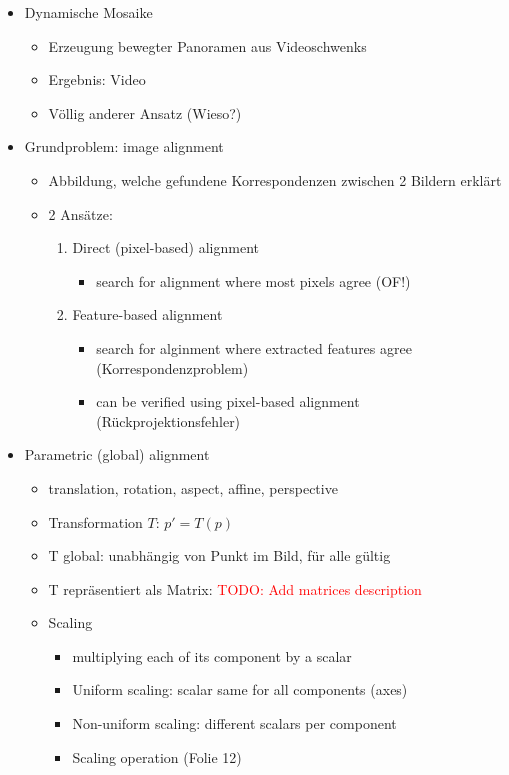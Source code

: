 \documentclass{report}
\newcommand{\todo}[2][red]{\textcolor{#1}{TODO: #2}}
\begin{document}
\begin{itemize}
		\item Dynamische Mosaike
		\begin{itemize}
			\item Erzeugung bewegter Panoramen aus Videoschwenks
			\item Ergebnis: Video
			\item Völlig anderer Ansatz (Wieso?)
		\end{itemize}
		
		\item Grundproblem: image alignment
		\begin{itemize}
			\item Abbildung, welche gefundene Korrespondenzen zwischen 2 Bildern erklärt
			\item 2 Ansätze:
			\begin{enumerate}
				\item Direct (pixel-based) alignment
				\begin{itemize}
					\item search for alignment where most pixels agree (OF!)
				\end{itemize}
				\item Feature-based alignment
				\begin{itemize}
					\item search for alginment where extracted features agree (Korrespondenzproblem)
					\item can be verified using pixel-based alignment (Rückprojektionsfehler)
				\end{itemize}
			\end{enumerate}
		\end{itemize}
		
		\item Parametric (global) alignment
		\begin{itemize}
			\item translation, rotation, aspect, affine, perspective
			\item Transformation $T$: $p' = T(p)$
			\item T global: unabhängig von Punkt im Bild, für alle gültig
			\item T repräsentiert als Matrix: \todo{Add matrices description}\newline
			
			\item Scaling
			\begin{itemize}
				\item multiplying each of its component by a scalar
				\item Uniform scaling: scalar same for all components (axes)
				\item Non-uniform scaling: different scalars per component
				\item Scaling operation (Folie 12)
			\end{itemize}
			

\end{itemize}
\end{itemize}
\end{document}
